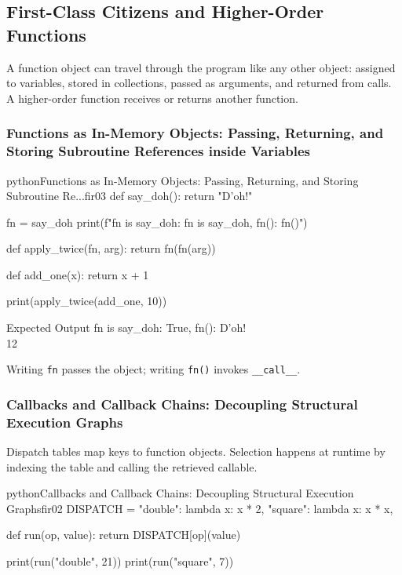 \subsection{First-Class Citizens and Higher-Order Functions}

A function object can travel through the program like any other object: assigned to variables, stored in collections, passed as arguments, and returned from calls. A higher-order function receives or returns another function.

\subsubsection{Functions as In-Memory Objects: Passing, Returning, and Storing Subroutine References inside Variables}

\begin{codebox}[]{python}{Functions as In-Memory Objects: Passing, Returning, and Storing Subroutine Re...}{fir03}
def say_doh():
    return "D'oh!"

fn = say_doh
print(f"fn is say_doh: {fn is say_doh}, fn(): {fn()}")

def apply_twice(fn, arg):
    return fn(fn(arg))

def add_one(x):
    return x + 1

print(apply_twice(add_one, 10))
\end{codebox}


\begin{iobox}{Expected Output}
fn is say\_doh: True, fn(): D'oh! \\
12 \\
\end{iobox}




Writing \texttt{fn} passes the object; writing \texttt{fn()} invokes \texttt{\_\_call\_\_}.

\subsubsection{Callbacks and Callback Chains: Decoupling Structural Execution Graphs}

Dispatch tables map keys to function objects. Selection happens at runtime by indexing the table and calling the retrieved callable.

\begin{codebox}[]{python}{Callbacks and Callback Chains: Decoupling Structural Execution Graphs}{fir02}
DISPATCH = {
    "double": lambda x: x * 2,
    "square": lambda x: x * x,
}

def run(op, value):
    return DISPATCH[op](value)

print(run("double", 21))
print(run("square", 7))
\end{codebox}


